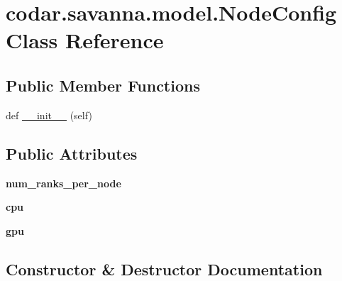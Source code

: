 \hypertarget{classcodar_1_1savanna_1_1model_1_1_node_config}{}\section{codar.\+savanna.\+model.\+Node\+Config Class Reference}
\label{classcodar_1_1savanna_1_1model_1_1_node_config}
\subsection*{Public Member Functions}
\begin{DoxyCompactItemize}
\item 
def \hyperlink{classcodar_1_1savanna_1_1model_1_1_node_config_ad1fad3d3d97b1683dd4d28f77836a002}{\+\_\+\+\_\+init\+\_\+\+\_\+} (self)
\end{DoxyCompactItemize}
\subsection*{Public Attributes}
\begin{DoxyCompactItemize}
\item 
\mbox{\label{classcodar_1_1savanna_1_1model_1_1_node_config_abfaac776b1cc5d4b0e6b3dd9d57a32be}} 
{\bfseries num\+\_\+ranks\+\_\+per\+\_\+node}
\item 
\mbox{\label{classcodar_1_1savanna_1_1model_1_1_node_config_ae3b3d48cf476cc01128973780c9ca256}} 
{\bfseries cpu}
\item 
\mbox{\label{classcodar_1_1savanna_1_1model_1_1_node_config_a073c4acfc108df407fbd8ce570bade6b}} 
{\bfseries gpu}
\end{DoxyCompactItemize}


\subsection{Constructor \& Destructor Documentation}
\mbox{\label{classcodar_1_1savanna_1_1model_1_1_node_config_ad1fad3d3d97b1683dd4d28f77836a002}} 
